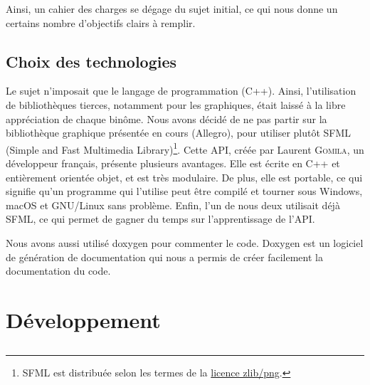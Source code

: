 \documentclass[a4paper,10pt]{report}
\begin{document}
Ainsi, un cahier des charges se dégage du sujet initial, ce qui nous donne un certains nombre d'objectifs clairs à remplir.

\section{Choix des technologies}
Le sujet n'imposait que le langage de programmation (C++). Ainsi, l'utilisation de bibliothèques tierces, notamment pour les graphiques, était laissé à la libre appréciation de chaque binôme. Nous avons décidé de ne pas partir sur la bibliothèque graphique présentée en cours (Allegro), pour utiliser plutôt SFML (Simple and Fast Multimedia Library)\footnote{SFML est distribuée selon les termes de la \href{https://opensource.org/licenses/Zlib}{licence zlib/png}.}. Cette API, créée par Laurent \textsc{Gomila}, un développeur français, présente plusieurs avantages. Elle est écrite en C++ et entièrement orientée objet, et est très modulaire. De plus, elle est portable, ce qui signifie qu'un programme qui l'utilise peut être compilé et tourner sous Windows, macOS et GNU/Linux sans problème. Enfin, l'un de nous deux utilisait déjà SFML, ce qui permet de gagner du temps sur l'apprentissage de l'API.

Nous avons aussi utilisé doxygen pour commenter le code. Doxygen est un logiciel de génération de documentation qui nous a permis de créer facilement la documentation du code.

\chapter{Développement}
\section{}
\appendix
\listoffigures
\listoftables
\printindex
\end{document}
